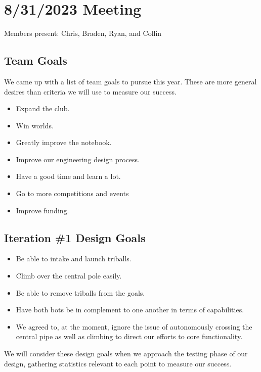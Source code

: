 \section{8/31/2023 Meeting}

Members present: Chris, Braden, Ryan, and Collin

\subsection{Team Goals}
We came up with a list of team goals to pursue this year. These are more general
desires than criteria we will use to measure our success.
\begin{itemize}
      \item Expand the club.
      \item Win worlds.
      \item Greatly improve the notebook.
      \item Improve our engineering design process.
      \item Have a good time and learn a lot.
      \item Go to more competitions and events
      \item Improve funding.
\end{itemize}

\subsection{Iteration \#1 Design Goals}
\begin{itemize}
      \item Be able to intake and launch triballs.
      \item Climb over the central pole easily.
      \item Be able to remove triballs from the goals.
      \item Have both bots be in complement to one another in terms of
            capabilities.
      \item We agreed to, at the moment, ignore the issue of autonomously
            crossing the central pipe as well as climbing to direct our efforts
            to core functionality.
\end{itemize}
We will consider these design goals when we approach the testing phase of our
design, gathering statistics relevant to each point to measure our success.


